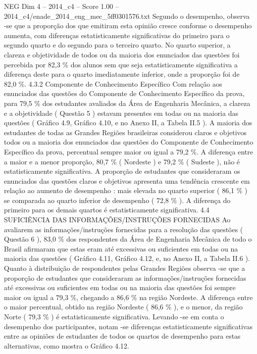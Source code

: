 \begin{textsample}{NEG Dim 4 – 2014\_c4 – Score 1.00 – 2014\_c4/enade\_2014\_eng\_mec\_5ff0301576.txt}
Segundo o desempenho, observa -se que a proporção dos que emitiram esta opinião cresce conforme o desempenho aumenta, com diferenças estatisticamente significativas do primeiro para o segundo quarto e do segundo para o terceiro quarto.
No quarto superior, a clareza e objetividade de todos ou da maioria dos enunciados das questões foi percebida por 82,3 \% dos alunos sem que seja estatisticamente significativa a diferença deste para o quarto imediatamente inferior, onde a proporção foi de 82,0 \%. 4.3.2 Componente de Conhecimento Específico Com relação aos enunciados das questões do Componente de Conhecimento Específico da prova, para 79,5 \% dos estudantes avaliados da Área de Engenharia Mecânica, a clareza e a objetividade ( Questão 5 ) estavam presentes em todas ou na maioria das questões ( Gráfico 4.9, Gráfico 4.10, e no Anexo II, a Tabela II.5 ).
A maioria dos estudantes de todas as Grandes Regiões brasileiras considerou claros e objetivos todos ou a maioria dos enunciados das questões do Componente de Conhecimento Específico da prova, percentual sempre maior ou igual a 79,2 \%.
A diferença entre a maior e a menor proporção, 80,7 \% ( Nordeste ) e 79,2 \% ( Sudeste ), não é estatisticamente significativa.
A proporção de estudantes que consideraram os enunciados das questões claros e objetivos apresenta uma tendência crescente em relação ao aumento de desempenho : mais elevada no quarto superior ( 86,1 \% ) se comparada ao quarto inferior de desempenho ( 72,8 \% ).
A diferença do primeiro para os demais quartos é estatisticamente significativa. 4.4 SUFICIÊNCIA DAS INFORMAÇÕES/INSTRUÇÕES FORNECIDAS Ao avaliarem as informações/instruções fornecidas para a resolução das questões ( Questão 6 ), 83,0 \% dos respondentes da Área de Engenharia Mecânica de todo o Brasil afirmaram que estas eram até excessivas ou suficientes em todas ou na maioria das questões ( Gráfico 4.11, Gráfico 4.12, e, no Anexo II, a Tabela II.6 ).
Quanto à distribuição de respondentes pelas Grandes Regiões observa -se que a proporção de estudantes que consideraram as informações/instruções fornecidas até excessivas ou suficientes em todas ou na maioria das questões foi sempre maior ou igual a 79,3 \%, chegando a 86,6 \% na região Nordeste.
A diferença entre o maior percentual, obtido na região Nordeste ( 86,6 \% ), e o menor, da região Norte ( 79,3 \% ) é estatisticamente significativa.
Levando -se em conta o desempenho dos participantes, notam -se diferenças estatisticamente significativas entre as opiniões de estudantes de todos os quartos de desempenho para estas alternativas, como mostra o Gráfico 4.12.

\end{textsample}
